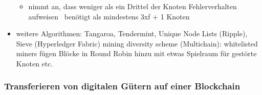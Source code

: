 \begin{itemize}
\begin{itemize}
                    \item nimmt an, dass weniger als ein Drittel der Knoten Fehlerverhalten aufweisen \textrightarrow\ benötigt als mindestens 3xf + 1 Knoten
                \end{itemize}
            \item weitere Algorithmen: Tangaroa, Tendermint, Unique Node Lists (Ripple), Sieve (Hyperledger Fabric) mining diversity scheme (Multichain): whitelisted miners fügen Blöcke in Round Robin hinzu mit etwas Spielraum für gestörte Knoten etc.
        \end{itemize}
    
    \subsubsection*{Transferieren von digitalen Gütern auf einer Blockchain}
